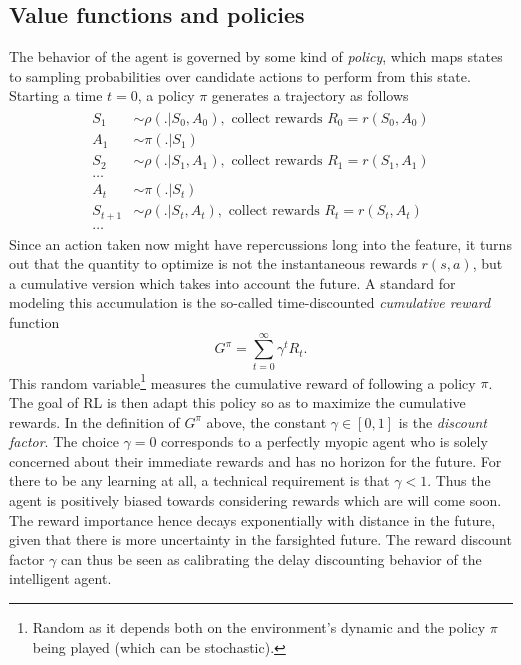 \documentclass{article} %
\begin{document}
\subsection{Value functions and policies}
The behavior of the agent is governed by some kind of \textit{policy}, which maps states to
sampling probabilities over candidate actions to perform from this state. Starting a time $t=0$,
a policy $\pi$ generates a trajectory as follows
\begin{eqnarray*}
  \begin{split}
    S_1 &\sim \rho(.|S_0,A_0), \text{ collect rewards }R_0 = r(S_0, A_0)\\
    A_1 &\sim \pi(.|S_1)\\
    S_2 &\sim \rho(.|S_1,A_1), \text{ collect rewards }R_1 = r(S_1, A_1)\\
    \ldots\\
    A_{t} &\sim \pi(.|S_{t})\\
    S_{t+1} &\sim \rho(.|S_{t},A_{t}), \text{ collect rewards }R_{t} = r(S_{t}, A_{t})\\
    \ldots
  \end{split}
\end{eqnarray*}
Since an action taken now might have repercussions long into the feature, it turns out that the
quantity to optimize is not the instantaneous rewards $r(s, a)$, but a
cumulative version which takes into account the future. A standard for
modeling this accumulation is the so-called
time-discounted \textit{cumulative reward} function
\begin{equation}
  \label{eq:cumr}
  G^\pi = \sum_{t=0}^{\infty}\gamma^{t}R_t.
\end{equation}
This random variable\footnote{Random as it depends both on the environment's dynamic and the
  policy $\pi$ being played (which can be stochastic).}  measures the cumulative reward of
following a
policy $\pi$. The  goal of RL is then adapt this policy so as to  maximize the cumulative rewards.
In the definition of $G^\pi$ above, the constant $\gamma \in [0, 1]$ is the \textit{discount factor}. The choice $\gamma = 0$   corresponds to a perfectly myopic agent who is solely concerned about their immediate rewards and has no horizon
for the future. For there to be any learning at all, a technical requirement is that $\gamma < 1$.
Thus the agent is positively biased towards considering rewards which are will
come soon. The reward importance hence decays exponentially
with distance in the future,
given that there is more uncertainty in the farsighted future.
The reward discount factor $\gamma$ can thus be seen as calibrating
the delay discounting behavior of the intelligent agent.
\end{document}
